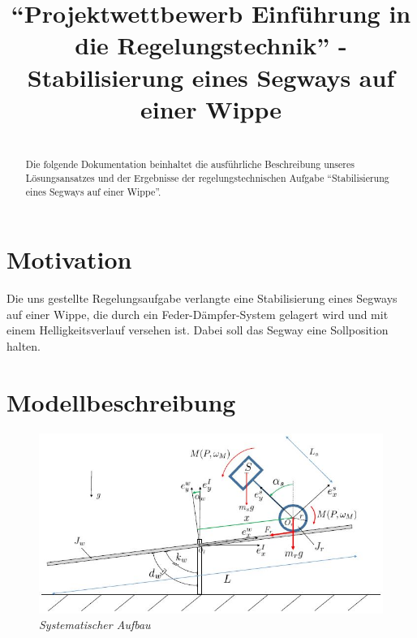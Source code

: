 \documentclass[pdf]{ifacconf}
\begin{document}
\begin{frontmatter}

\title{``Projektwettbewerb Einführung in die Regelungstechnik'' - Stabilisierung eines Segways auf einer Wippe}


\textbf{}

\begin{abstract}\\                        
Die folgende Dokumentation beinhaltet die ausführliche Beschreibung unseres Lösungsansatzes und der Ergebnisse der regelungstechnischen Aufgabe ``Stabilisierung eines Segways auf einer Wippe''. 
\end{abstract}

\end{frontmatter}

\section{Motivation}
Die uns gestellte Regelungsaufgabe verlangte eine Stabilisierung eines Segways auf einer Wippe, die durch ein Feder-Dämpfer-System gelagert wird und mit einem Helligkeitsverlauf versehen ist. Dabei soll das Segway eine Sollposition halten. 

\section{Modellbeschreibung}
\begin{figure}[h]	
\centerline{\includegraphics[width=\linewidth]{Bilder/SystematischerAufbau.jpg}}
	\caption{\textit{Systematischer Aufbau}}
\end{figure}
\end{document}
